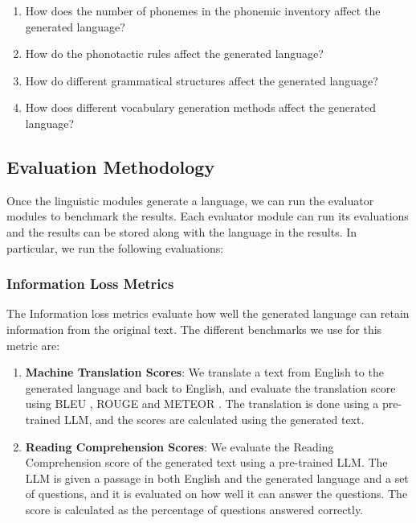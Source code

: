 \begin{enumerate}
	\item How does the number of phonemes in the phonemic inventory affect the generated language?
	\item How do the phonotactic rules affect the generated language?
	\item How do different grammatical structures affect the generated language?
	\item How does different vocabulary generation methods affect the generated language?
\end{enumerate}



\subsection{Evaluation Methodology}
Once the linguistic modules generate a language, we can run the evaluator modules to benchmark the results. Each evaluator module can run its evaluations
and the results can be stored along with the language in the results. In particular, we run the following evaluations:

\subsubsection{Information Loss Metrics}
The Information loss metrics evaluate how well the generated language can retain information from the original text. The different benchmarks we use for this metric are:

\begin{enumerate}
	\item \textbf{Machine Translation Scores}: We translate a text from English to the generated language and back to English, and evaluate the translation 
	score using BLEU \cite{papineniBLEUMethodAutomatic2002}, ROUGE \cite{linROUGEPackageAutomatic2004} and METEOR \cite{banerjeeMETEORAutomaticMetric2005}. 
	The translation is done using a pre-trained LLM, and the scores are calculated using the generated text.
	\item \textbf{Reading Comprehension Scores}: We evaluate the Reading Comprehension score of the generated text using a pre-trained LLM. 
	The LLM is given a passage in both English and the generated language and a set of questions, and it is evaluated on how well it can answer the questions. 
	The score is calculated as the percentage of questions answered correctly.
\end{enumerate}

